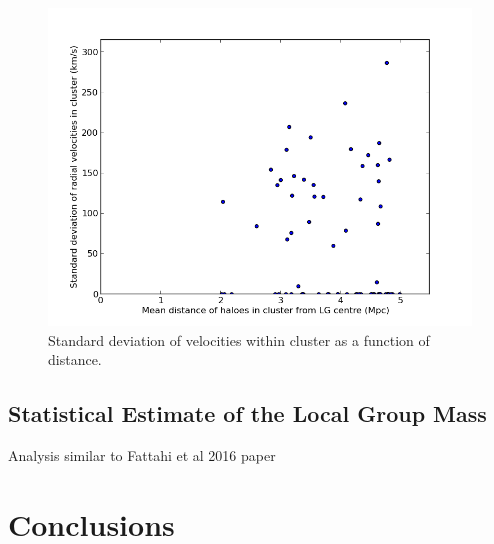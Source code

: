 \documentclass[english, oneside]{HYgradu}
\begin{document}
\begin{figure}
   \centering
   \includegraphics[width=\textwidth]{kuvat/diststd-113.png}
   \caption{Standard deviation of velocities within cluster as a function of distance.}\label{fig:diststd}
\end{figure}

\section{Statistical Estimate of the Local Group Mass}
Analysis similar to Fattahi et al 2016 paper

%
%

\chapter{Conclusions}






%
%
\end{document}
